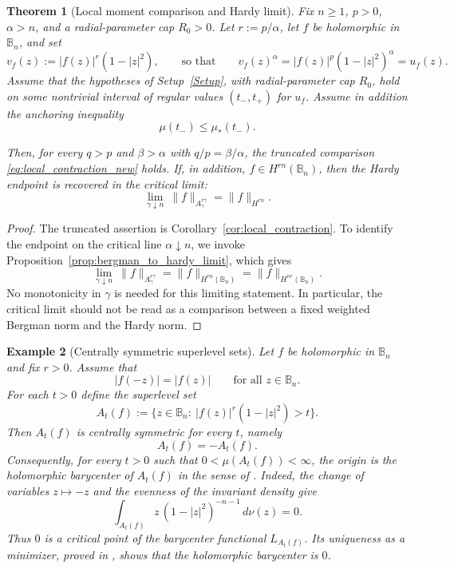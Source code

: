 \documentclass[11pt]{amsart}
\theoremstyle{plain}
\newtheorem{theorem}{Theorem}[section]
\newtheorem{example}[theorem]{Example}
\theoremstyle{definition}
\theoremstyle{remark}
\newcommand{\B}{\mathbb{B}}
\newcommand{\Bn}{\mathbb{B}_n}
\begin{document}
\begin{theorem}[Local moment comparison and Hardy limit]\label{thm:local_chain}
Fix $n\ge 1$, $p>0$, $\alpha>n$, and a radial-parameter cap $R_0>0$.
Let $r:=p/\alpha$, let $f$ be holomorphic in $\B_n$, and set
\[
v_f(z):=|f(z)|^{r}(1-|z|^2),
\qquad\text{so that}\qquad
v_f(z)^{\alpha}=|f(z)|^{p}(1-|z|^2)^{\alpha}=u_f(z).
\]
Assume that the hypotheses of Setup~\ref{Setup}, with radial-parameter cap $R_0$,
hold on some nontrivial interval of regular values $(t_-,t_+)$ for $u_f$.
Assume in addition the anchoring inequality
\[
\mu(t_-)\le\mu_*(t_-).
\]

Then, for every $q>p$ and $\beta>\alpha$ with $q/p=\beta/\alpha$, the
truncated comparison \eqref{eq:local_contraction_new} holds.  If, in addition,
$f\in H^{rn}(\B_n)$, then the Hardy endpoint is recovered in the critical limit:
\begin{equation*}\label{eq:hardy_limit_statement}
\lim_{\gamma\downarrow n}\ \|f\|_{A_\gamma^{r\gamma}}=\|f\|_{H^{rn}}.
\end{equation*}
\end{theorem}




\begin{proof}
The truncated assertion is Corollary~\ref{cor:local_contraction}.  To identify
the endpoint on the critical line $\alpha\downarrow n$, we invoke
Proposition~\ref{prop:bergman_to_hardy_limit}, which gives
\[
\lim_{\gamma\downarrow n}\ \|f\|_{A_\gamma^{r\gamma}}=\|f\|_{H^{rn}(\B_n)}
=\|f\|_{H^{nr}(\B_n)}.
\]
No monotonicity in $\gamma$ is needed for this limiting statement. In
particular, the critical limit should not be read as a comparison between a
fixed weighted Bergman norm and the Hardy norm.
\end{proof}
\begin{example}[Centrally symmetric superlevel sets]\label{ex:symmetric_superlevels}
Let $f$ be holomorphic in $\Bn$ and fix $r>0$. Assume that
\begin{equation*}\label{eq:mod_even}
|f(-z)|=|f(z)| \qquad \text{for all } z\in\Bn .
\end{equation*}
For each $t>0$ define the superlevel set
\[
A_t(f):=\{z\in\Bn:\ |f(z)|^{r}(1-|z|^2)>t\}.
\]
Then $A_t(f)$ is centrally symmetric for every $t$, namely
\[
A_t(f)=-A_t(f).
\]
Consequently, for every $t>0$ such that $0<\mu(A_t(f))<\infty$, the origin is
the holomorphic barycenter of $A_t(f)$ in the sense of
\cite{JacimovicKalajAnnFennMath}. Indeed, the change of variables
$z\mapsto -z$ and the evenness of the invariant density give
\[
\int_{A_t(f)} z\,(1-|z|^2)^{-n-1}\,d\nu(z)=0.
\]
Thus $0$ is a critical point of the barycenter functional $L_{A_t(f)}$.
Its uniqueness as a minimizer, proved in
\cite[Theorem~5.1]{JacimovicKalajAnnFennMath}, shows that the holomorphic
barycenter is $0$.
\end{example}
\end{document}
